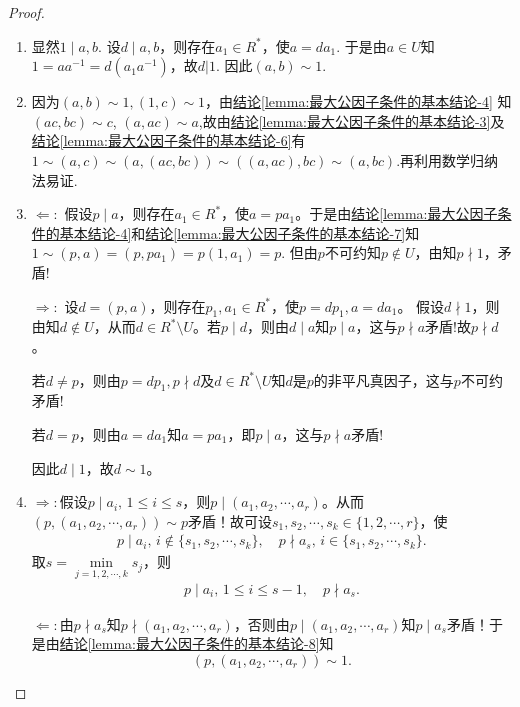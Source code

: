 \documentclass[../../main.tex]{subfiles}%
\begin{document}
\begin{proof}
\begin{enumerate}[(1)]
\item 显然$1\mid a,b$. 设$d\mid a,b$，则存在$a_1\in R^*$，使$a=da_1$. 于是由$a\in U$知$1=aa^{-1}=d\left( a_1a^{-1} \right)$，故$d|1$. 因此$\left( a,b \right) \sim 1$.

\item 因为\( (a, b) \sim 1 ,(1,c)\sim 1\)，由\hyperref[lemma:最大公因子条件的基本结论-4]{结论\ref{lemma:最大公因子条件的基本结论-4}} 知 \( (ac, bc) \sim c \), \( (a, ac) \sim a \),故由\hyperref[lemma:最大公因子条件的基本结论-3]{结论\ref{lemma:最大公因子条件的基本结论-3}}及\hyperref[lemma:最大公因子条件的基本结论-6]{结论\ref{lemma:最大公因子条件的基本结论-6}}有 \( 1 \sim (a, c) \sim (a, (ac, bc)) \sim ((a, ac), bc) \sim (a, bc) \).再利用数学归纳法易证.

\item $\Longleftarrow:$ 假设$p \mid a$，则存在$a_1 \in R^*$，使$a = pa_1$。于是由\hyperref[lemma:最大公因子条件的基本结论-4]{结论\ref{lemma:最大公因子条件的基本结论-4}}和\hyperref[lemma:最大公因子条件的基本结论-7]{结论\ref{lemma:最大公因子条件的基本结论-7}}知
$1 \sim (p, a) = (p, pa_1) = p(1, a_1) = p.$
但由$p$不可约知$p \notin U$，由知$p \nmid 1$，矛盾!

$\Longrightarrow:$ 设$d = (p, a)$，则存在$p_1, a_1 \in R^*$，使$p = dp_1, a = da_1$。
假设$d \nmid 1$，则由知$d \notin U$，从而$d \in R^* \setminus U$。若$p \mid d$，则由$d \mid a$知$p \mid a$，这与$p \nmid a$矛盾!故$p \nmid d$。

若$d \neq p$，则由$p = dp_1, p \nmid d$及$d \in R^* \setminus U$知$d$是$p$的非平凡真因子，这与$p$不可约矛盾!

若$d = p$，则由$a = da_1$知$a = pa_1$，即$p \mid a$，这与$p \nmid a$矛盾!

因此$d \mid 1$，故$d \sim 1$。

\item $\Longrightarrow:$假设$p \mid a_i,\,1 \leqslant i \leqslant s$，则$p \mid (a_1,a_2,\cdots,a_r)$。从而$(p,(a_1,a_2,\cdots,a_r)) \sim p$矛盾！故可设$s_1,s_2,\cdots,s_k \in \{1,2,\cdots,r\}$，使
\begin{align*}
p \mid a_i,\,i \notin \{s_1,s_2,\cdots,s_k\}, \quad p \nmid a_s,\,i \in \{s_1,s_2,\cdots,s_k\}.
\end{align*}
取$s = \min\limits_{j=1,2,\cdots,k} s_j$，则
\begin{align*}
p \mid a_i,\,1 \leqslant i \leqslant s-1, \quad p \nmid a_s.
\end{align*}

$\Longleftarrow:$由$p \nmid a_s$知$p \nmid (a_1,a_2,\cdots,a_r)$，否则由$p \mid (a_1,a_2,\cdots,a_r)$知$p \mid a_s$矛盾！于是由\hyperref[lemma:最大公因子条件的基本结论-8]{结论\ref{lemma:最大公因子条件的基本结论-8}}知$$(p,(a_1,a_2,\cdots,a_r)) \sim 1.$$
\end{enumerate}

\end{proof}
\end{document}
